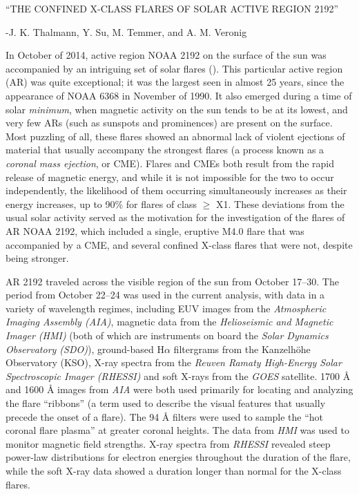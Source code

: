 \documentclass[12pt]{article}
\begin{document}
\begin{centering}
    {\large ``THE CONFINED X-CLASS FLARES OF SOLAR ACTIVE REGION 2192''}
\end{centering}
\begin{centering}
    -J. K. Thalmann, Y. Su, M. Temmer, and A. M. Veronig
\end{centering}

In October of 2014, active region NOAA 2192 on the surface of the sun
was accompanied by an intriguing set of solar flares 
(\cite{main_paper}).
This particular active region (AR) was quite exceptional;
it was the largest seen in almost 25 years,
since the appearance of NOAA 6368 in November of 1990.
It also emerged during a time of solar \emph{minimum}, when magnetic
activity on the sun tends to be at its lowest, and very few
ARs (such as sunspots and prominences) are present on the surface.
Most puzzling of all, these flares showed an abnormal lack of
violent ejections of material that usually accompany the strongest flares
(a process known as a \emph{coronal mass ejection}, or CME).
Flares and CMEs both result from the rapid release of
magnetic energy, and while it is not impossible for the two
to occur independently, the likelihood of them occurring
simultaneously increases as their energy increases, up to
90\% for flares of class $\geq$ X1.
These deviations from the usual solar activity
served as the motivation for the investigation of the flares of
AR NOAA 2192,
which included
a single, eruptive M4.0 flare that was accompanied by a CME,
and several confined X-class flares that were not, despite being
stronger.

AR 2192 traveled across the visible region of the sun from
October 17--30. The period from October 22--24
was used in the current analysis, with data in a variety of
wavelength regimes, including
EUV images from the \emph{Atmospheric Imaging Assembly (AIA)},
magnetic data from the \emph{Helioseismic and Magnetic Imager (HMI)}
(both of which are instruments on board the
\emph{Solar Dynamics Observatory (SDO)}),
ground-based H$\alpha$ filtergrams from the Kanzelh\"{o}he
Observatory (KSO),
X-ray spectra from the
\emph{Reuven Ramaty High-Energy Solar Spectroscopic Imager (RHESSI)}
and soft X-rays from the \emph{GOES} satellite.
1700 \AA{} and 1600 \AA{} images from \emph{AIA}
were both used primarily for locating and analyzing the flare ``ribbons''
(a term used to describe the visual features that usually precede
the onset of a flare). The 94 \AA{} filters were used to sample
the ``hot coronal flare plasma'' at greater coronal heights.
The data from \emph{HMI} was used to monitor magnetic field strengths.  
X-ray spectra from \emph{RHESSI} revealed steep power-law distributions for
electron energies throughout the duration of the flare, while the
soft X-ray data showed a duration longer than normal for the X-class
flares.
\end{document}
